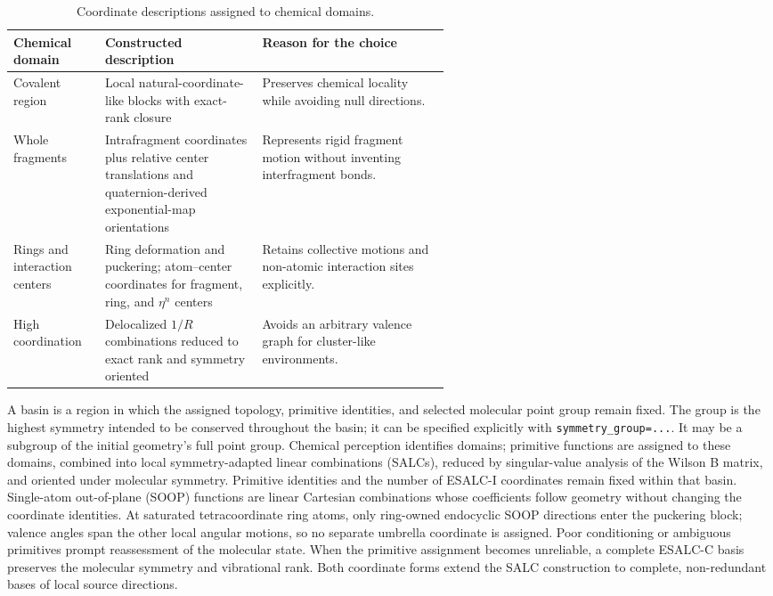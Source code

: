 \documentclass[10pt]{article}
\begin{document}
\begin{table}[htbp]
\centering
\small
\caption{{Coordinate descriptions assigned to chemical domains.}}
\label{tab:si-domain-policy}
\begin{tabularx}{\linewidth}{@{}>{\raggedright\arraybackslash}p{0.21\linewidth}>{\raggedright\arraybackslash}p{0.36\linewidth}>{\raggedright\arraybackslash}X@{}}
\toprule
Chemical domain & Constructed description & Reason for the choice \\
\midrule
Covalent region & Local natural-coordinate-like blocks with exact-rank closure
& Preserves chemical locality while avoiding null directions. \\
Whole fragments & Intrafragment coordinates plus relative center translations
and quaternion-derived exponential-map orientations & Represents rigid fragment motion without
inventing interfragment bonds. \\
Rings and interaction centers & Ring deformation and puckering; atom--center
coordinates for fragment, ring, and \(\eta^n\) centers & Retains collective
motions and non-atomic interaction sites explicitly. \\
High coordination & Delocalized \(1/R\) combinations reduced to exact rank and
symmetry oriented & Avoids an arbitrary valence graph for cluster-like
environments. \\
\bottomrule
\end{tabularx}
\end{table}

{A basin is a region in which the assigned topology, primitive
identities, and selected molecular point group remain fixed. The group is the
highest symmetry intended to be conserved throughout the basin; it can be
specified explicitly with \texttt{symmetry\_group=...}. It may be a subgroup
of the initial geometry's full point group. Chemical perception
identifies domains; primitive functions
are assigned to these domains, combined into local symmetry-adapted linear
combinations (SALCs), reduced by singular-value analysis of the Wilson B matrix,
and oriented under molecular symmetry.  Primitive identities and the number of
ESALC-I coordinates remain fixed within that basin.  Single-atom out-of-plane
(SOOP) functions are linear
Cartesian combinations whose coefficients follow geometry without changing
the coordinate identities. At saturated tetracoordinate ring atoms,
only ring-owned endocyclic SOOP directions enter the puckering block; valence
angles span the other local angular motions, so no separate umbrella
coordinate is assigned. Poor conditioning or ambiguous primitives prompt
reassessment of the molecular state.  When the primitive assignment becomes unreliable,
a complete ESALC-C basis preserves the molecular symmetry and vibrational rank.
Both coordinate forms extend the SALC construction to complete,
non-redundant bases of local source directions.
}
\end{document}
